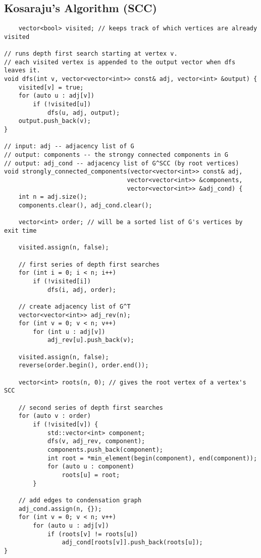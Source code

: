 \documentclass{article}
\begin{document}
\subsection{Kosaraju's Algorithm (SCC)}
\begin{lstlisting}
    vector<bool> visited; // keeps track of which vertices are already visited

// runs depth first search starting at vertex v.
// each visited vertex is appended to the output vector when dfs leaves it.
void dfs(int v, vector<vector<int>> const& adj, vector<int> &output) {
    visited[v] = true;
    for (auto u : adj[v])
        if (!visited[u])
            dfs(u, adj, output);
    output.push_back(v);
}

// input: adj -- adjacency list of G
// output: components -- the strongy connected components in G
// output: adj_cond -- adjacency list of G^SCC (by root vertices)
void strongly_connected_components(vector<vector<int>> const& adj,
                                  vector<vector<int>> &components,
                                  vector<vector<int>> &adj_cond) {
    int n = adj.size();
    components.clear(), adj_cond.clear();

    vector<int> order; // will be a sorted list of G's vertices by exit time

    visited.assign(n, false);

    // first series of depth first searches
    for (int i = 0; i < n; i++)
        if (!visited[i])
            dfs(i, adj, order);

    // create adjacency list of G^T
    vector<vector<int>> adj_rev(n);
    for (int v = 0; v < n; v++)
        for (int u : adj[v])
            adj_rev[u].push_back(v);

    visited.assign(n, false);
    reverse(order.begin(), order.end());

    vector<int> roots(n, 0); // gives the root vertex of a vertex's SCC

    // second series of depth first searches
    for (auto v : order)
        if (!visited[v]) {
            std::vector<int> component;
            dfs(v, adj_rev, component);
            components.push_back(component);
            int root = *min_element(begin(component), end(component));
            for (auto u : component)
                roots[u] = root;
        }

    // add edges to condensation graph
    adj_cond.assign(n, {});
    for (int v = 0; v < n; v++)
        for (auto u : adj[v])
            if (roots[v] != roots[u])
                adj_cond[roots[v]].push_back(roots[u]);
}
\end{lstlisting}
\end{document}
